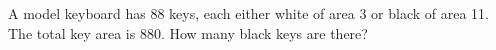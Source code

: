 A model keyboard has 88 keys, each either white of area 3 or black of area 11. The total key area is 880. How many black keys are there?
